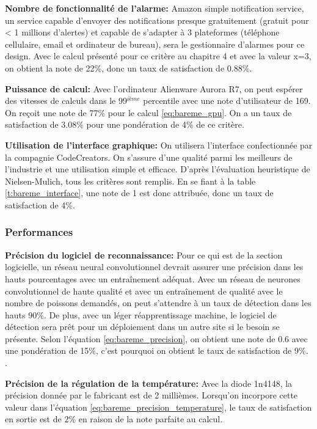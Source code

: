 \textbf{Nombre de fonctionnalité de l'alarme:} Amazon simple notification service, un service capable d'envoyer des notifications presque gratuitement (gratuit pour < 1 millions d'alertes) et capable de s'adapter à 3 plateformes (téléphone cellulaire, email et ordinateur de bureau), sera le gestionnaire d'alarmes pour ce design. Avec le calcul présenté pour ce critère au chapitre 4 et avec la valeur x=3, on obtient la note de 22\%, donc un taux de satisfaction de 0.88\%.
\vspace{5mm}

\textbf{Puissance de calcul:} Avec l'ordinateur Alienware Aurora R7, on peut espérer des vitesses de calculs dans le 99$^{ième}$ percentile avec une note d'utilisateur de 169. On reçoit une note de 77\% pour le calcul \ref{eq:bareme_gpu}. On a un taux de satisfaction de 3.08\% pour une pondération de 4\% de ce critère.
\vspace{5mm}

\textbf{Utilisation de l’interface graphique:}
On utilisera l’interface confectionnée par la compagnie CodeCreators. On s’assure d’une qualité parmi les meilleurs de l’industrie et une utilisation simple et efficace. D’après l'évaluation heuristique de Nielsen-Mulich, tous les critères sont remplis. En se fiant à la table \ref{t:bareme_interface}, une note de 1 est donc attribuée, donc un taux de satisfaction de 4\%.


\subsubsection{Performances}

\textbf{Précision du logiciel de reconnaissance:} Pour ce qui est de la section logicielle, un réseau neural convolutionnel devrait assurer une précision dans les hauts pourcentages avec un entraînement adéquat. Avec un réseau de neurones convolutionnel de haute qualité et avec un entraînement de qualité avec le nombre de poissons demandés, on peut s’attendre à un taux de détection dans les hauts 90\%. De plus, avec un léger réapprentissage machine, le logiciel de détection sera prêt pour un déploiement dans un autre site si le besoin se présente. Selon l’équation \ref{eq:bareme_precision}, on obtient une note de 0.6 avec une pondération de 15\%, c’est pourquoi on obtient le taux de satisfaction de 9\%. \cite{neural_yt}.
\vspace{5mm}


\textbf{Précision de la régulation de la température:} Avec la diode 1n4148, la précision donnée par le fabricant est de 2 millièmes. Lorsqu'on incorpore cette valeur dans l'équation \ref{eq:bareme_precision_temperature}, le taux de satisfaction en sortie est de 2\% en raison de la note parfaite au calcul.
\vspace{5mm}

